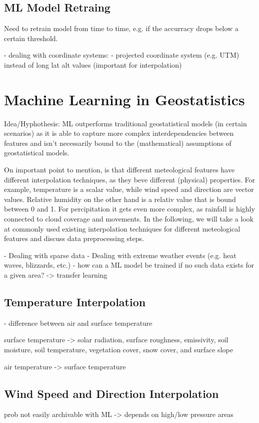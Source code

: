 \subsection{ML Model Retraing}
Need to retrain model from time to time, e.g. if the accurracy drops below a certain threshold.


- dealing with coordinate systems:
    - projected coordinate system (e.g. UTM) instead of long lat alt values (important for interpolation)

\section{Machine Learning in Geostatistics}

Idea/Hyphothesis: ML outperforms traditional geostatistical models (in certain scenarios) as it is able to capture more complex interdependencies between features and isn't necessarily bound to the (mathematical) assumptions of geostatistical models.

On important point to mention, is that different meteological features have different interpolation techniques, as they beve different (physical) properties. For example, temperature is a scalar value, while wind speed and direction are vector values. Relative humidity on the other hand is a relativ value that is bound between 0 and 1. For percipitation it gets even more complex, as rainfall is highly connected to cloud coverage and movements. In the following, we will take a look at commonly used existing interpolation techniques for different meteological features and discuss data preprocessing steps.

- Dealing with sparse data
- Dealing with extreme weather events (e.g. heat waves, blizzards, etc.)
- how can a ML model be trained if no such data exists for a given area? -> transfer learning

\subsection{Temperature Interpolation}
- difference between air and surface temperature

surface temperature -> solar radiation, surface roughness, emissivity, soil moisture, soil temperature, vegetation cover, snow cover, and surface slope

air temperature -> surface temperature

\subsection{Wind Speed and Direction Interpolation}
prob not easily archivable with ML -> depends on high/low pressure areas


